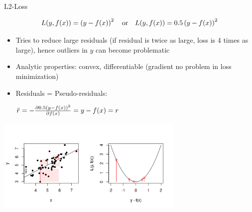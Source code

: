 \begin{vbframe}{L2-Loss}

\vspace*{-0.5cm}

$$
L(y, f(x)) = \left(y-f(x)\right)^2 \quad \text{or} \quad L(y, f(x)) = 0.5 \left(y-f(x)\right)^2
$$

\vspace*{-2mm}

\begin{itemize}
\item Tries to reduce large residuals (if residual is twice as large, loss is 4 times as large), hence outliers in $y$ can become problematic
\item Analytic properties: convex, differentiable (gradient no problem in loss minimization)
\item Residuals = Pseudo-residuals: \begin{footnotesize} $\tilde r = - \frac{\partial{0.5 (y-f(x))^2}}{\partial f(x)} = y - f(x) = r$\end{footnotesize}
\end{itemize}




\vspace*{-6mm}

\begin{center}
  \includegraphics[width = 9cm]{figure_man/loss_quadratic_plot1.png} \\
\end{center}

\end{vbframe}


